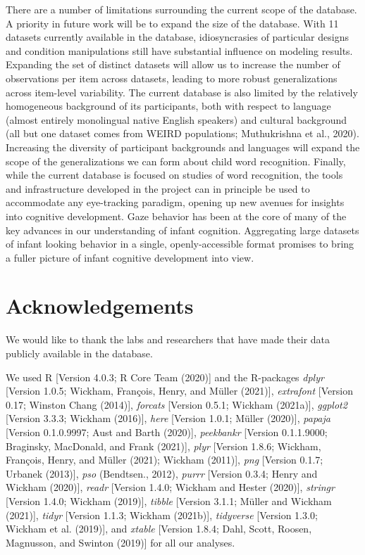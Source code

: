 \documentclass[
  english,
  man,floatsintext]{apa6}
\begin{document}
There are a number of limitations surrounding the current scope of the database. A priority in future work will be to expand the size of the database. With 11 datasets currently available in the database, idiosyncrasies of particular designs and condition manipulations still have substantial influence on modeling results. Expanding the set of distinct datasets will allow us to increase the number of observations per item across datasets, leading to more robust generalizations across item-level variability. The current database is also limited by the relatively homogeneous background of its participants, both with respect to language (almost entirely monolingual native English speakers) and cultural background (all but one dataset comes from WEIRD populations; Muthukrishna et al., 2020). Increasing the diversity of participant backgrounds and languages will expand the scope of the generalizations we can form about child word recognition.
Finally, while the current database is focused on studies of word recognition, the tools and infrastructure developed in the project can in principle be used to accommodate any eye-tracking paradigm, opening up new avenues for insights into cognitive development. Gaze behavior has been at the core of many of the key advances in our understanding of infant cognition. Aggregating large datasets of infant looking behavior in a single, openly-accessible format promises to bring a fuller picture of infant cognitive development into view.

\hypertarget{acknowledgements}{%
\section{Acknowledgements}\label{acknowledgements}}

We would like to thank the labs and researchers that have made their data publicly available in the database.

We used R {[}Version 4.0.3; R Core Team (2020){]} and the R-packages \emph{dplyr} {[}Version 1.0.5; Wickham, François, Henry, and Müller (2021){]}, \emph{extrafont} {[}Version 0.17; Winston Chang (2014){]}, \emph{forcats} {[}Version 0.5.1; Wickham (2021a){]}, \emph{ggplot2} {[}Version 3.3.3; Wickham (2016){]}, \emph{here} {[}Version 1.0.1; Müller (2020){]}, \emph{papaja} {[}Version 0.1.0.9997; Aust and Barth (2020){]}, \emph{peekbankr} {[}Version 0.1.1.9000; Braginsky, MacDonald, and Frank (2021){]}, \emph{plyr} {[}Version 1.8.6; Wickham, François, Henry, and Müller (2021); Wickham (2011){]}, \emph{png} {[}Version 0.1.7; Urbanek (2013){]}, \emph{pso} (Bendtsen., 2012), \emph{purrr} {[}Version 0.3.4; Henry and Wickham (2020){]}, \emph{readr} {[}Version 1.4.0; Wickham and Hester (2020){]}, \emph{stringr} {[}Version 1.4.0; Wickham (2019){]}, \emph{tibble} {[}Version 3.1.1; Müller and Wickham (2021){]}, \emph{tidyr} {[}Version 1.1.3; Wickham (2021b){]}, \emph{tidyverse} {[}Version 1.3.0; Wickham et al. (2019){]}, and \emph{xtable} {[}Version 1.8.4; Dahl, Scott, Roosen, Magnusson, and Swinton (2019){]} for all our analyses.
\end{document}
